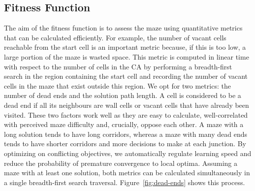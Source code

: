 \subsection{Fitness Function}
The aim of the fitness function is to assess the maze using quantitative metrics that can be calculated efficiently. For example, the number of vacant cells reachable from the start cell is an important metric because, if this is too low, a large portion of the maze is wasted space. This metric is computed in linear time with respect to the number of cells in the CA by performing a breadth-first search in the region containing the start cell and recording the number of vacant cells in the maze that exist outside this region. We opt for two metrics: the number of dead ends and the solution path length. A cell is considered to be a dead end if all its neighbours are wall cells or vacant cells that have already been visited. These two factors work well as they are easy to calculate, well-correlated with perceived maze difficulty\cite{adams2018evolving} and, crucially, oppose each other. A maze with a long solution tends to have long corridors, whereas a maze with many dead ends tends to have shorter corridors and more decisions to make at each junction. By optimizing on conflicting objectives, we automatically regulate learning speed and reduce the probability of premature convergence to local optima. Assuming a maze with at least one solution, both metrics can be calculated simultaneously in a single breadth-first search traversal. Figure~\ref{fig:dead-ends} shows this process.\\

